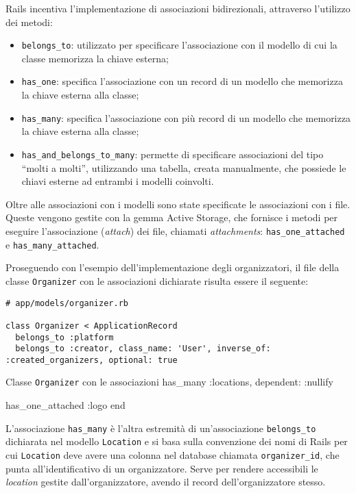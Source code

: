 Rails incentiva l'implementazione di associazioni bidirezionali, attraverso l'utilizzo dei metodi:
\begin{itemize}
	\item \verb|belongs_to|: utilizzato per specificare l'associazione con il modello di cui la classe memorizza la chiave esterna;
	\item \verb|has_one|: specifica l'associazione con un record di un modello che memorizza la chiave esterna alla classe;
	\item \verb|has_many|: specifica l'associazione con più record di un modello che memorizza la chiave esterna alla classe;
	\item \verb|has_and_belongs_to_many|: permette di specificare associazioni del tipo ``molti a molti'', utilizzando una tabella, creata manualmente, che possiede le chiavi esterne ad entrambi i modelli coinvolti.
\end{itemize}
Oltre alle associazioni con i modelli sono state specificate le associazioni con i file. Queste vengono gestite con la gemma Active Storage, che fornisce i metodi per eseguire l'associazione (\emph{attach}) dei file, chiamati \emph{attachments}: \verb|has_one_attached| e \verb|has_many_attached|.

Proseguendo con l'esempio dell'implementazione degli organizzatori, il file della classe \verb|Organizer| con le associazioni dichiarate risulta essere il seguente:

\begin{verbatim}
# app/models/organizer.rb

class Organizer < ApplicationRecord
  belongs_to :platform
  belongs_to :creator, class_name: 'User', inverse_of: :created_organizers, optional: true
\end{verbatim}

\begin{code}{Classe \texttt{Organizer} con le associazioni}
  has_many :locations, dependent: :nullify

  has_one_attached :logo
end
\end{code}

\noindent L'associazione \verb|has_many| è l'altra estremità di un'associazione \verb|belongs_to| dichiarata nel modello \verb|Location| e si basa sulla convenzione dei nomi di Rails per cui \verb|Location| deve avere una colonna nel database chiamata \verb|organizer_id|, che punta all'identificativo di un organizzatore. Serve per rendere accessibili le \emph{location} gestite dall'organizzatore, avendo il record dell'organizzatore stesso.

